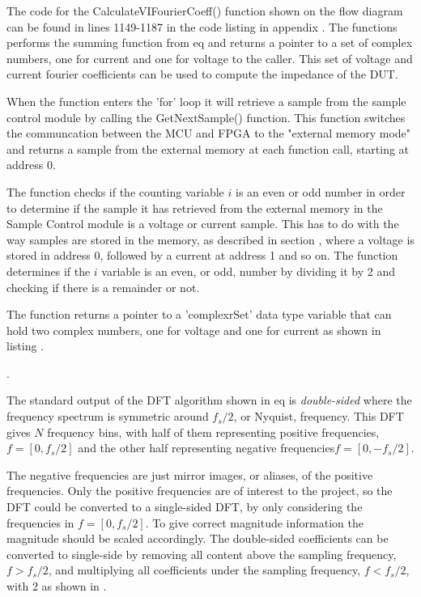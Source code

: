 The code for the CalculateVIFourierCoeff() function shown on the flow diagram can be found in lines 1149-1187 in the code listing in appendix .
The functions performs the summing function from eq  and returns a pointer to a set of complex numbers, one for current and one for voltage to the caller. This set of voltage and current fourier coefficients can be used to compute the impedance of the DUT. 

When the function enters the 'for' loop it will retrieve a sample from the sample control module by calling the GetNextSample() function. This function switches the communcation between the MCU and FPGA to the "external memory mode" and returns a sample from the external memory at each function call, starting at address 0.

The function checks if the counting variable $i$ is an even or odd number in order to determine if the sample it has retrieved from the external memory in the Sample Control module is a voltage or current sample. This has to do with the way samples are stored in the memory, as described in section , where a voltage is stored in address 0, followed by a current at address 1 and so on. The function determines if the $i$ variable is an even, or odd, number by dividing it by 2 and checking if there is a remainder or not.

The function returns a pointer to a 'complexrSet' data type variable that can hold two complex numbers, one for voltage and one for current as shown in listing .

. 

The standard output of the DFT algorithm shown in eq  is \textit{double-sided} where the frequency spectrum is symmetric around $f_s / 2$, or Nyquist, frequency. This DFT gives $N$ frequency bins, with half of them representing positive frequencies, $f = [0, f_s/2]$ and the other half representing negative frequencies$f = [0, -f_s/2]$.

The negative frequencies are just mirror images, or aliases, of the positive frequencies. Only the positive frequencies are of interest to the project, so the DFT could be converted to a single-sided DFT, by only considering the frequencies in $f = [0, f_s/2]$. To give correct magnitude information the magnitude should be scaled accordingly. The double-sided coefficients can be converted to single-side by removing all content above the sampling frequency, $f > f_s /2$, and multiplying all coefficients under the sampling frequency, $f < f_s /2$, with 2 as shown in .

